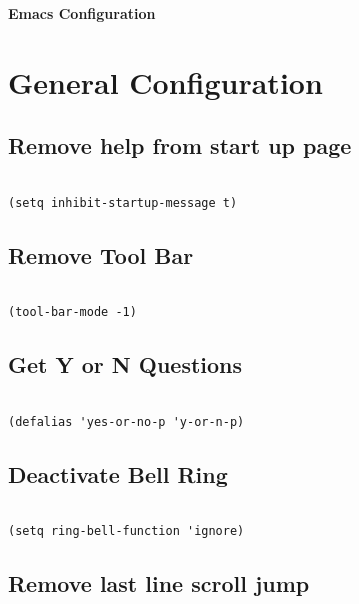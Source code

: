 \documentclass[11pt]{article}
\date{\today}
\title{}
\begin{document}
\tableofcontents

\textbf{Emacs Configuration}


\section{General Configuration}
\label{sec:orgec41528}
\subsection{Remove help from start up page}
\label{sec:org565f913}

\begin{verbatim}

(setq inhibit-startup-message t)

\end{verbatim}

\subsection{Remove Tool Bar}
\label{sec:org952fc43}

\begin{verbatim}

(tool-bar-mode -1)

\end{verbatim}
\subsection{Get Y or N Questions}
\label{sec:org532ea4f}

\begin{verbatim}

(defalias 'yes-or-no-p 'y-or-n-p)

\end{verbatim}

\subsection{Deactivate Bell Ring}
\label{sec:org51e9db8}

\begin{verbatim}

(setq ring-bell-function 'ignore)

\end{verbatim}

\subsection{Remove last line scroll jump}
\label{sec:org9e32c70}
\end{document}
